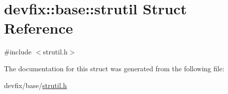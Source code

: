 \hypertarget{structdevfix_1_1base_1_1strutil}{}\section{devfix\+:\+:base\+:\+:strutil Struct Reference}
\label{structdevfix_1_1base_1_1strutil}


{\ttfamily \#include $<$strutil.\+h$>$}



The documentation for this struct was generated from the following file\+:\begin{DoxyCompactItemize}
\item 
devfix/base/\hyperlink{strutil_8h}{strutil.\+h}\end{DoxyCompactItemize}
